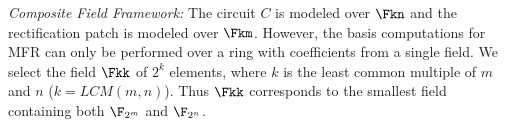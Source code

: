 

{\it Composite Field Framework:} The circuit $C$ is modeled over
$\Fkn$ and the rectification patch is modeled over $\Fkm$. However, the \Grobner basis 
computations for MFR can only be performed over a ring with
coefficients from a single field. We select the field $\Fkk$
of $2^k$ elements, where $k$ is the least common multiple of $m$ and
$n$ ($k=LCM(m,n)$). Thus $\Fkk$ corresponds to the smallest field
containing both $\F_{2^m}$ and $\F_{2^n}$.

